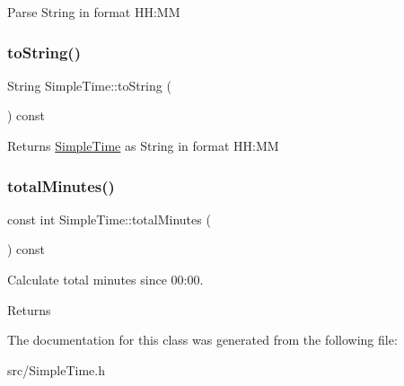 Parse String in format HH\+:MM \mbox{\label{class_simple_time_a9de383bf9aaf23dbba9b13e0b9b4f0ed}} 
\subsubsection{\texorpdfstring{toString()}{toString()}}
{\footnotesize\ttfamily String Simple\+Time\+::to\+String (\begin{DoxyParamCaption}{ }\end{DoxyParamCaption}) const\hspace{0.3cm}{\ttfamily [inline]}}

\begin{DoxyReturn}{Returns}
\mbox{\hyperlink{class_simple_time}{Simple\+Time}} as String in format HH\+:MM 
\end{DoxyReturn}
\mbox{\label{class_simple_time_a9fd5a5025ccd3bd60d4049c5c113ec4c}} 
\subsubsection{\texorpdfstring{totalMinutes()}{totalMinutes()}}
{\footnotesize\ttfamily const int Simple\+Time\+::total\+Minutes (\begin{DoxyParamCaption}{ }\end{DoxyParamCaption}) const\hspace{0.3cm}{\ttfamily [inline]}}

Calculate total minutes since 00\+:00. \begin{DoxyReturn}{Returns}

\end{DoxyReturn}


The documentation for this class was generated from the following file\+:\begin{DoxyCompactItemize}
\item 
src/Simple\+Time.\+h\end{DoxyCompactItemize}

